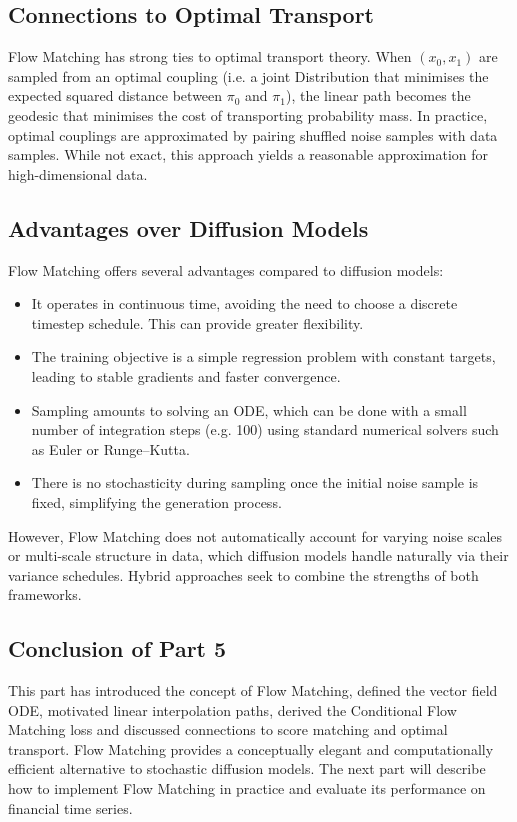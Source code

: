 \subsection{Connections to Optimal Transport}

Flow Matching has strong ties to optimal transport theory.  When
$(x_0,x_1)$ are sampled from an optimal coupling (i.e. a joint
Distribution that minimises the expected squared distance between
$\pi_0$ and $\pi_1$), the linear path becomes the geodesic that
minimises the cost of transporting probability mass.  In practice,
optimal couplings are approximated by pairing shuffled noise samples
with data samples.  While not exact, this approach yields a reasonable
approximation for high-dimensional data.

\subsection{Advantages over Diffusion Models}

Flow Matching offers several advantages compared to diffusion models:
\begin{itemize}
  \item It operates in continuous time, avoiding the need to choose a
    discrete timestep schedule.  This can provide greater flexibility.
  \item The training objective is a simple regression problem with
    constant targets, leading to stable gradients and faster
    convergence.
  \item Sampling amounts to solving an ODE, which can be done with a
    small number of integration steps (e.g. 100) using standard
    numerical solvers such as Euler or Runge–Kutta.
  \item There is no stochasticity during sampling once the initial
    noise sample is fixed, simplifying the generation process.
\end{itemize}

However, Flow Matching does not automatically account for varying
noise scales or multi-scale structure in data, which diffusion models
handle naturally via their variance schedules.  Hybrid approaches
seek to combine the strengths of both frameworks.

\subsection{Conclusion of Part 5}

This part has introduced the concept of Flow Matching, defined the
vector field ODE, motivated linear interpolation paths, derived the
Conditional Flow Matching loss and discussed connections to score
matching and optimal transport.  Flow Matching provides a
conceptually elegant and computationally efficient alternative to
stochastic diffusion models.  The next part will describe how to
implement Flow Matching in practice and evaluate its performance on
financial time series.

